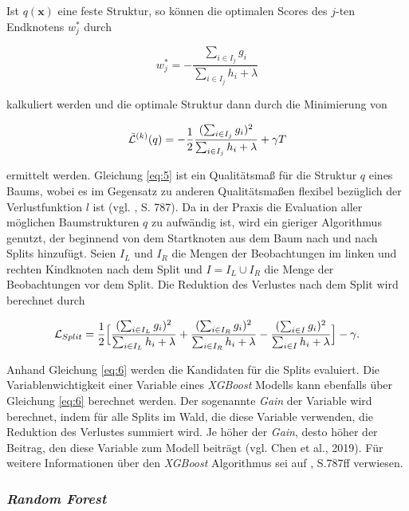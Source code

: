 \documentclass[a4paper,11pt]{article}
\begin{document}
Ist $q(\bm{x})$ eine feste Struktur, so können die optimalen Scores des $j$-ten Endknotens $w_j^*$ durch

\[ w_j^* = - \frac{\sum_{i \in I_j}g_i}{\sum_{i \in I_j}h_i + \lambda} \]

kalkuliert werden und die optimale Struktur dann durch die Minimierung von 

\begin{equation}\label{eq:5}
    \Tilde{\mathcal{L}}^{(k)}(q) = -\frac{1}{2} \frac{(\sum_{i \in I_j}g_i)^2}{\sum_{i \in I_j}h_i + \lambda} + \gamma T
\end{equation}

ermittelt werden. Gleichung \ref{eq:5} ist ein Qualitätsmaß für die Struktur $q$ eines Baums, wobei es im Gegensatz zu anderen Qualitätsmaßen flexibel bezüglich der Verlustfunktion $l$ ist (vgl. \cite{XGBoost}, S. 787).
Da in der Praxis die Evaluation aller möglichen Baumstrukturen $q$ zu aufwändig ist, wird ein gieriger Algorithmus genutzt, der beginnend von dem Startknoten aus dem Baum nach und nach Splits hinzufügt. Seien $I_L$ und $I_R$ die Mengen der Beobachtungen im linken und rechten Kindknoten nach dem Split und $I = I_L \cup I_R$ die Menge der Beobachtungen vor dem Split. Die Reduktion des Verlustes nach dem Split wird berechnet durch
 
 \begin{equation}\label{eq:6}
    \mathcal{L}_{Split} = \frac{1}{2} \Bigl[ \frac{(\sum_{i \in I_L}g_i)^2}{\sum_{i \in I_L}h_i + \lambda} + \frac{(\sum_{i \in I_R}g_i)^2}{\sum_{i \in I_R}h_i + \lambda} - \frac{(\sum_{i \in I}g_i)^2}{\sum_{i \in I}h_i + \lambda} \Bigr] - \gamma . 
\end{equation}{} 

Anhand Gleichung \ref{eq:6} werden die Kandidaten für die Splits evaluiert. Die Variablenwichtigkeit einer Variable eines \textit{XGBoost} Modells kann ebenfalls über Gleichung \ref{eq:6} berechnet werden. Der sogenannte \textit{Gain} der Variable wird berechnet, indem für alle Splits im Wald, die diese Variable verwenden, die Reduktion des Verlustes summiert wird. Je höher der \textit{Gain}, desto höher der Beitrag, den diese Variable zum Modell beiträgt (vgl. Chen et al., 2019). Für weitere Informationen über den \textit{XGBoost} Algorithmus sei auf \cite{XGBoost}, S.787ff verwiesen.


\subsubsection{\textit{Random Forest}}\label{kap:RF}
\end{document}
